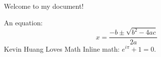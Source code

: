 \documentclass{article}
\begin{document}
Welcome to my document!

An equation:
\[
x = \frac{-b \pm \sqrt{b^2 - 4ac}}{2a}
\]
Kevin Huang Loves Math
Inline math: \( e^{i\pi} + 1 = 0 \).
\end{document}
